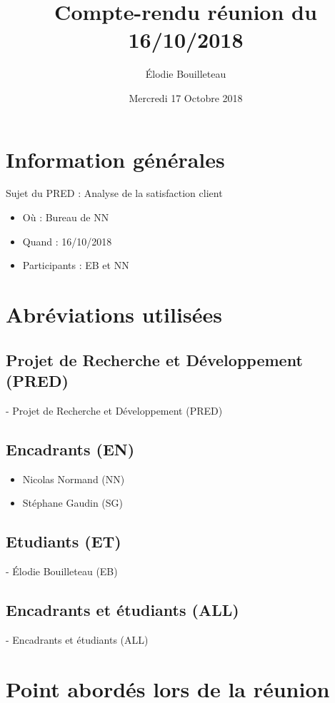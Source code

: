 \documentclass[11pt]{report}
\title{Compte-rendu réunion du 16/10/2018}
\author{Élodie Bouilleteau}
\date{Mercredi 17 Octobre 2018}
\begin{document}
\maketitle
\renewcommand{\thesection}{\arabic{section}} 
\section{Information générales}
Sujet du PRED : Analyse de la satisfaction client
\\
	\begin{itemize}
		\item Où : Bureau de NN
		\item Quand : 16/10/2018
		\item Participants : EB et NN
	\end{itemize}

\section{Abréviations utilisées}

\subsection{Projet de Recherche et Développement (PRED)}
- Projet de Recherche et Développement (PRED)

\subsection{Encadrants (EN)}
 	\begin{itemize}
		\item Nicolas Normand (NN)
		\item Stéphane Gaudin (SG)
	\end{itemize}
    
\subsection{Etudiants (ET)}
- Élodie Bouilleteau (EB)

\subsection{Encadrants et étudiants (ALL)}
- Encadrants et étudiants (ALL)

\newpage

\section{Point abordés lors de la réunion}
\end{document}
